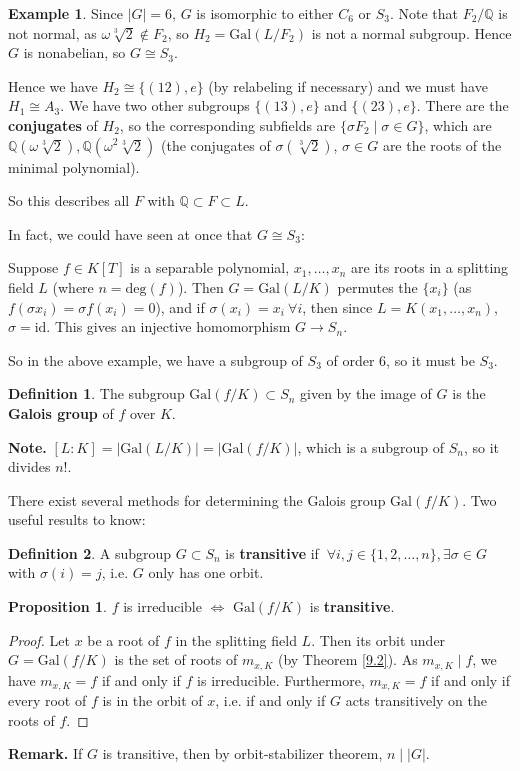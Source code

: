 \documentclass{article}
\theoremstyle{definition}
\newtheorem{prop}[theorem]{Proposition}
\newtheorem{example}{Example}[section]
\newtheorem{defn}{Definition}[section]
\begin{document}
\begin{example}
    Since $|G|=6$, $G$ is isomorphic to either $C_6$ or $S_3$. Note that $F_2 / \mathbb{Q}$ is not normal, as $\omega \sqrt[3]{2} \not\in F_2$, so $H_2 = \text{Gal}(L/F_2)$ is not a normal subgroup. Hence $G$ is nonabelian, so $G \cong S_3$.

    Hence we have $H_2 \cong \{(12),e\}$ (by relabeling if necessary) and we must have $H_1 \cong A_3$. We have two other subgroups $\{(13), e\}$ and $\{(23),e\}$. There are the \textbf{conjugates} of $H_2$, so the corresponding subfields are $\{\sigma F_2 \mid \sigma \in G\}$, which are $\mathbb{Q}(\omega \sqrt[3]{2}), \mathbb{Q}(\omega^2 \sqrt[3]{2})$ (the conjugates of $\sigma(\sqrt[3]{2})$, $\sigma \in G$ are the roots of the minimal polynomial).

    So this describes all $F$ with $\mathbb{Q} \subset F \subset L$.
\end{example}

In fact, we could have seen at once that $G \cong S_3$:

Suppose $f \in K[T]$ is a separable polynomial, $x_1,\ldots,x_n$ are its roots in a splitting field $L$ (where $n=\text{deg}(f)$). Then $G = \text{Gal}(L/K)$ permutes the $\{x_i\}$ (as $f(\sigma x_i) = \sigma f(x_i) = 0$), and if $\sigma(x_i) = x_i ~\forall i$, then since $L = K(x_1,\ldots,x_n)$, $\sigma = \text{id}$. This gives an injective homomorphism $G \to S_n$.

So in the above example, we have a subgroup of $S_3$ of order $6$, so it must be
$S_3$.

\begin{defn}
    The subgroup $\text{Gal}(f/K) \subset S_n$ given by the image of $G$ is the \textbf{Galois group} of $f$ over $K$.
\end{defn}
\textbf{Note.} $[L:K] = |\text{Gal}(L/K)| = |\text{Gal}(f/K)|$, which is a subgroup of $S_n$, so it divides $n!$.

\vspace{1mm}

There exist several methods for determining the Galois group $\text{Gal}(f/K)$. Two useful results to know:
\begin{defn}
    A subgroup $G \subset S_n$ is \textbf{transitive} if $~\forall i,j \in \{1,2,\ldots,n\}, \exists \sigma \in G$ with $\sigma(i)=j$, i.e. $G$ only has one orbit.
\end{defn}
\begin{prop}
    $f$ is irreducible $\iff$ $\text{Gal}(f/K)$ is \textbf{transitive}.
\end{prop}
\begin{proof}
    Let $x$ be a root of $f$ in the splitting field $L$. Then its orbit under $G = \text{Gal}(f/K)$ is the set of roots of $m_{x,K}$ (by Theorem \ref{9.2}). As $m_{x,K} \mid f$, we have $m_{x,K} = f$ if and only if $f$ is irreducible. Furthermore, $m_{x,K} = f$ if and only if every root of $f$ is in the orbit of $x$, i.e. if and only if $G$ acts transitively on the roots of $f$.
\end{proof}
\textbf{Remark.} If $G$ is transitive, then by orbit-stabilizer theorem, $n \mid |G|$.
\end{document}
